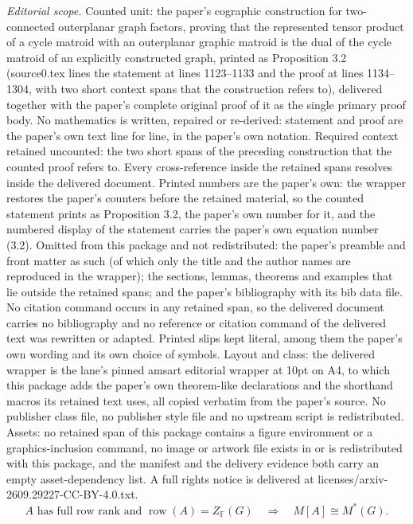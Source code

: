 \documentclass[10pt,a4paper]{amsart}
\providecommand{\F}{\mathbb F}
\DeclareMathOperator{\row}{row}
\numberwithin{equation}{section}
\theoremstyle{definition}
\theoremstyle{remark}
\begin{document}
\noindent\textit{Editorial scope.} Counted unit: the paper's cographic construction for two-connected outerplanar graph factors, proving that the represented tensor product of a cycle matroid with an outerplanar graphic matroid is the dual of the cycle matroid of an explicitly constructed graph, printed as Proposition 3.2 (source0.tex lines the statement at lines 1123--1133 and the proof at lines 1134--1304, with two short context spans that the construction refers to), delivered together with the paper's complete original proof of it as the single primary proof body. No mathematics is written, repaired or re-derived: statement and proof are the paper's own text line for line, in the paper's own notation. Required context retained uncounted: the two short spans of the preceding construction that the counted proof refers to. Every cross-reference inside the retained spans resolves inside the delivered document. Printed numbers are the paper's own: the wrapper restores the paper's counters before the retained material, so the counted statement prints as Proposition 3.2, the paper's own number for it, and the numbered display of the statement carries the paper's own equation number (3.2). Omitted from this package and not redistributed: the paper's preamble and front matter as such (of which only the title and the author names are reproduced in the wrapper); the sections, lemmas, theorems and examples that lie outside the retained spans; and the paper's bibliography with its bib data file. No citation command occurs in any retained span, so the delivered document carries no bibliography and no reference or citation command of the delivered text was rewritten or adapted. Printed slips kept literal, among them the paper's own wording and its own choice of symbols. Layout and class: the delivered wrapper is the lane's pinned amsart editorial wrapper at 10pt on A4, to which this package adds the paper's own theorem-like declarations and the shorthand macros its retained text uses, all copied verbatim from the paper's source. No publisher class file, no publisher style file and no upstream script is redistributed. Assets: no retained span of this package contains a figure environment or a graphics-inclusion command, no image or artwork file exists in or is redistributed with this package, and the manifest and the delivery evidence both carry an empty asset-dependency list. A full rights notice is delivered at licenses/arxiv-2609.29227-CC-BY-4.0.txt.
\setcounter{section}{2}
\begin{equation}\label{eq:cycle-space-dual-representation}
 A\text{ has full row rank and }\row(A)=Z_{\F}(G)
 \quad\Longrightarrow\quad
 M[A]\cong M^*(G).
\end{equation}
\end{document}
